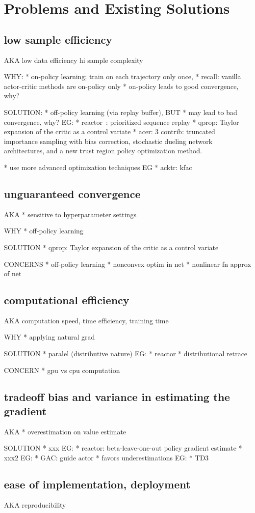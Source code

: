\section{Problems and Existing Solutions}

\subsection{low sample efficiency}
AKA
low data efficiency
hi sample complexity

WHY:
* on-policy learning; train on each trajectory only once,
  * recall: vanilla actor-critic methods are on-policy only
  * on-policy leads to good convergence, why?

SOLUTION:
* off-policy learning (via replay buffer),
  BUT
  * may lead to bad convergence, why?
  EG:
  * reactor~\cite{Gruslys2018}: prioritized sequence replay
  * qprop:  Taylor expansion of the critic as a control variate
  * acer: 3 contrib:
    truncated importance sampling with bias correction,
    stochastic dueling network architectures, and
    a new trust region policy optimization method.

* use more advanced optimization techniques
EG
* acktr: kfac

\subsection{unguaranteed convergence}

AKA
* sensitive to hyperparameter settings

WHY
* off-policy learning

SOLUTION
* qprop: Taylor expansion of the critic as a control variate

CONCERNS
* off-policy learning
* nonconvex optim in net
* nonlinear fn approx of net

\subsection{computational efficiency}
AKA
computation speed,
time efficiency,
training time

WHY
* applying natural grad

SOLUTION
* paralel (distributive nature)
  EG:
  * reactor
    * distributional retrace

CONCERN
* gpu vs cpu computation

\subsection{tradeoff bias and variance in estimating the gradient}
AKA
* overestimation on value estimate

SOLUTION
* xxx
  EG:
  * reactor: beta-leave-one-out policy gradient estimate
* xxx2
  EG:
  * GAC: guide actor
* favors underestimations
  EG:
  * TD3

\subsection{ease of implementation, deployment}
AKA
reproducibility

